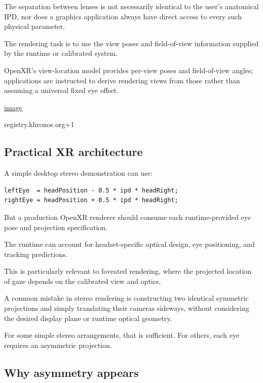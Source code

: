 The separation between lenses is not necessarily identical to the user's anatomical IPD, nor does a graphics application always have direct access to every such physical parameter.

The rendering task is to use the view poses and field-of-view information supplied by the runtime or calibrated system.

OpenXR's view-location model provides per-view poses and field-of-view angles; applications are instructed to derive rendering views from those rather than assuming a universal fixed eye offset. 

\href{https://www.google.com/s2/favicons?domain=https://registry.khronos.org&sz=32}{image}

registry.khronos.org+1

\subsection{Practical XR architecture}\label{02-foundations-ii-ch035-practical-xr-architecture}

\hypertarget{02-foundations-ii-ch035-practical-xr-architecture}{}

A simple desktop stereo demonstration can use:

\begin{verbatim}
leftEye  = headPosition - 0.5 * ipd * headRight;
rightEye = headPosition + 0.5 * ipd * headRight;
\end{verbatim}

But a production OpenXR renderer should consume each runtime-provided eye pose and projection specification.

The runtime can account for headset-specific optical design, eye positioning, and tracking predictions.

This is particularly relevant to foveated rendering, where the projected location of gaze depends on the calibrated view and optics.

A common mistake in stereo rendering is constructing two identical symmetric projections and simply translating their cameras sideways, without considering the desired display plane or runtime optical geometry.

For some simple stereo arrangements, that is sufficient. For others, each eye requires an asymmetric projection.

\subsection{Why asymmetry appears}\label{02-foundations-ii-ch035-why-asymmetry-appears}

